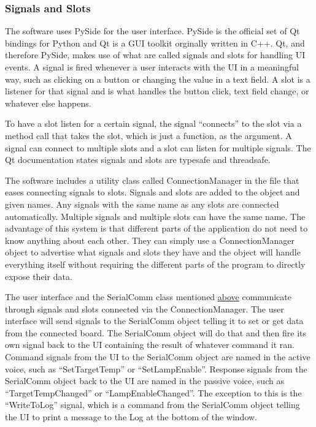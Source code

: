 \documentclass{article}
\begin{document}
\subsubsection{Signals and Slots} \label{sssec:SWSigSlots}
The software uses PySide for the user interface.  PySide is the official set of Qt bindings for
Python and Qt is a GUI toolkit orginally written in C++.  Qt, and therefore PySide, makes use of
what are called signals and slots for handling UI events.  A signal is fired whenever a user
interacts with the UI in a meaningful way, such as clicking on a button or changing the value in a
text field.  A slot is a listener for that signal and is what handles the button click, text field
change, or whatever else happens.

To have a slot listen for a certain signal, the signal ``connects'' to the slot via a method call
that takes the slot, which is just a function, as the argument.  A signal can connect to multiple
slots and a slot can listen for multiple signals.  The Qt documentation states signals and slots are
typesafe and threadsafe.

The software includes a utility class called ConnectionManager in the file 
that eases connecting signals to slots.  Signals and slots are added to the object and given names.
Any signals with the same name as any slots are connected automatically.  Multiple signals and
multiple slots can have the same name.  The advantage of this system is that different parts of the
application do not need to know anything about each other.  They can simply use a ConnectionManager
object to advertise what signals and slots they have and the object will handle everything itself
without requiring the different parts of the program to directly expose their data.

The user interface and the SerialComm class mentioned \hyperref[ssec:SWArchitecture]{above}
communicate through signals and slots connected via the ConnectionManager.  The user interface will
send signals to the SerialComm object telling it to set or get data from the connected board.  The
SerialComm object will do that and then fire its own signal back to the UI containing the result of
whatever command it ran.  Command signals from the UI to the SerialComm object are named in the
active voice, such as ``SetTargetTemp'' or ``SetLampEnable''.  Response signals from the SerialComm
object back to the UI are named in the passive voice, such as ``TargetTempChanged'' or
``LampEnableChanged''.  The exception to this is the ``WriteToLog'' signal, which is a command from
the SerialComm object telling the UI to print a message to the Log at the bottom of the window.
\end{document}
